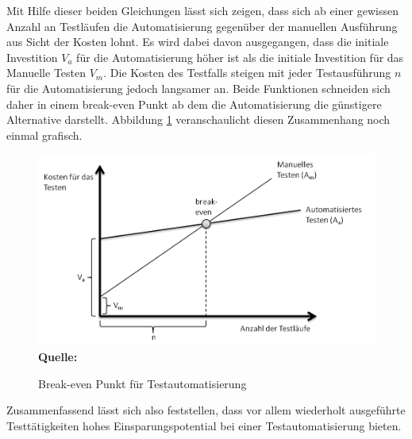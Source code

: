 Mit Hilfe dieser beiden Gleichungen lässt sich zeigen, dass sich ab einer gewissen Anzahl an Testläufen die Automatisierung gegenüber der manuellen Ausführung aus Sicht der Kosten lohnt.
Es wird dabei davon ausgegangen, dass die initiale Investition \(V_a\) für die Automatisierung höher ist als die initiale Investition für das Manuelle Testen \(V_m\).
Die Kosten des Testfalls steigen mit jeder Testausführung \(n\) für die Automatisierung jedoch langsamer an. Beide Funktionen schneiden sich daher in einem break-even Punkt ab dem die Automatisierung die günstigere Alternative darstellt.
Abbildung \ref{fig:breakEven} veranschaulicht diesen Zusammenhang noch einmal grafisch.

\begin{figure}[htb]
  \centering  
  \includegraphics[scale=0.8]{img/breakeven.png}\\
  \footnotesize\sffamily\textbf{Quelle:} \cite{ramler_economic_2006}
  \caption{Break-even Punkt für Testautomatisierung}
  \label{fig:breakEven}
\end{figure}

Zusammenfassend lässt sich also feststellen, dass vor allem wiederholt ausgeführte Testtätigkeiten hohes Einsparungspotential bei einer Testautomatisierung bieten.


